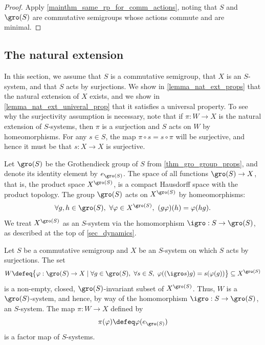 \begin{proof}
    Apply \cref{mainthm_same_rp_for_comm_actions}, noting that $S$ and $\gro(S)$ are commutative semigroups whose actions commute and are minimal.
\end{proof}

\subsection{The natural extension}
\label{sec_nat_ext}

In this section, we assume that $S$ is a commutative semigroup, that $X$ is an $S$-system, and that $S$ acts by surjections.  We show in \cref{lemma_nat_ext_props} that the natural extension of $X$ exists, and we show in \cref{lemma_nat_ext_univeral_prop} that it satisfies a universal property.
To see why the surjectivity assumption is necessary, note that if $\pi: W \to X$ is the natural extension of $S$-systems, then $\pi$ is a surjection and $S$ acts on $W$ by homeomorphisms.  For any $s \in S$, the map $\pi \circ s = s \circ \pi$ will be surjective, and hence it must be that $s : X \to X$ is surjective.

Let $\gro(S)$ be the Grothendieck group of $S$ from \cref{thm_gro_group_props}, and denote its identity element by $e_{\gro(S)}$.  The space of all functions $\gro(S) \to X$, that is, the product space $X^{\gro(S)}$, is a compact Hausdorff space with the product topology.  The group $\gro(S)$ acts on $X^{\gro(S)}$ by homeomorphisms:
\[
    \forall g, h \in \gro(S), \ \forall \varphi \in X^{\gro(S)}, \ (g \varphi) (h) = \varphi(hg).
\]
We treat $X^{\gro(S)}$ as an $S$-system via the homomorphism $\igro: S \to \gro(S)$, as described at the top of \cref{sec_dynamics}.


\begin{theorem}
\label{lemma_nat_ext_props}
Let $S$ be a commutative semigroup and $X$ be an $S$-system on which $S$ acts by surjections. The set
\[
    W \defeq \big\{ \varphi: \gro(S) \to X \mid \forall g \in \gro(S), \ \forall s \in S, \ \varphi((\igro s)g) = s (\varphi (g)) \big\} \subseteq X^{\gro(S)}
\]
is a non-empty, closed, $\gro(S)$-invariant subset of $X^{\gro(S)}$. Thus, $W$ is a $\gro(S)$-system, and hence, by way of the homomorphism $\igro: S \to \gro(S)$, an $S$-system. The map $\pi: W \to X$ defined by
\[\pi (\varphi) \defeq \varphi(e_{\gro(S)})\]
is a factor map of $S$-systems.
\end{theorem}

